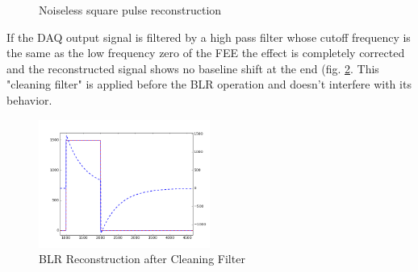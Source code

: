 \documentclass[a4paper,11pt]{report}
\begin{document}
\begin{figure}[!tbp]
  \centering
  \hfill
  \caption{Noiseless square pulse reconstruction}
  \label{fig:BLR_results}
\end{figure}

\par If the DAQ output signal is filtered by a high pass filter whose cutoff frequency is the same as the low frequency zero of the FEE the effect is completely corrected and the reconstructed signal shows no baseline shift at the end (fig. \ref{fig:BLR_filt}. This "cleaning filter" is applied before the BLR operation and doesn't interfere with its behavior. 

\begin{figure}
  \begin{center}
    \includegraphics[width=0.5\textwidth]{./figures/BLR_filt.png}
    \caption{BLR Reconstruction after Cleaning Filter}
    \label{fig:BLR_filt}
  \end{center}
\end{figure}
\end{document}

